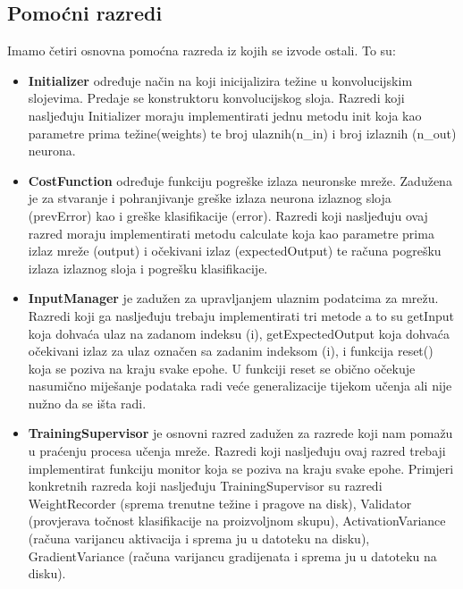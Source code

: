 \documentclass[times, utf8, zavrsni, numeric]{fer}
\begin{document}
\subsection{Pomoćni razredi}
Imamo četiri osnovna pomoćna razreda iz kojih se izvode ostali. To su:
\begin{itemize}
\item \textbf{Initializer} određuje način na koji inicijalizira težine u konvolucijskim slojevima. Predaje se konstruktoru konvolucijskog sloja. Razredi koji nasljeđuju Initializer moraju implementirati jednu metodu init koja kao parametre prima težine(weights) te broj ulaznih(n\_in) i broj izlaznih (n\_out) neurona.
\item \textbf{CostFunction} određuje funkciju pogreške izlaza neuronske mreže. Zadužena je za stvaranje i pohranjivanje greške izlaza neurona izlaznog sloja (prevError) kao i greške klasifikacije (error). Razredi koji nasljeđuju ovaj razred moraju implementirati metodu calculate koja kao parametre prima izlaz mreže (output) i očekivani izlaz (expectedOutput) te računa pogrešku izlaza izlaznog sloja i pogrešku klasifikacije.
\item \textbf{InputManager} je zadužen za upravljanjem ulaznim podatcima za mrežu. Razredi koji ga nasljeđuju trebaju implementirati tri metode a to su getInput koja dohvaća ulaz na zadanom indeksu (i), getExpectedOutput koja dohvaća očekivani izlaz za ulaz označen sa zadanim indeksom (i), i funkcija reset() koja se poziva na kraju svake epohe. U funkciji reset se obično očekuje nasumično miješanje podataka radi veće generalizacije tijekom učenja ali nije nužno da se išta radi.
\item \textbf{TrainingSupervisor} je osnovni razred zadužen za razrede koji nam pomažu u praćenju procesa učenja mreže. Razredi koji nasljeđuju ovaj razred trebaji implementirat funkciju monitor koja se poziva na kraju svake epohe. Primjeri konkretnih razreda koji nasljeđuju TrainingSupervisor su razredi WeightRecorder (sprema trenutne težine i pragove na disk), Validator (provjerava točnost klasifikacije na proizvoljnom skupu), ActivationVariance (računa varijancu aktivacija i sprema ju u datoteku na disku), GradientVariance (računa varijancu gradijenata i sprema ju u datoteku na disku).
\end{itemize}
\end{document}

